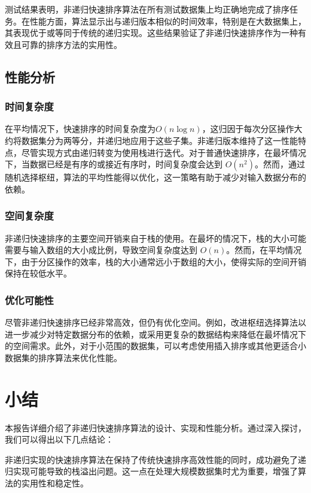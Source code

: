 \documentclass[12pt]{article}
\begin{document}
测试结果表明，非递归快速排序算法在所有测试数据集上均正确地完成了排序任务。在性能方面，算法显示出与递归版本相似的时间效率，特别是在大数据集上，其表现优于或等同于传统的递归实现。这些结果验证了非递归快速排序作为一种有效且可靠的排序方法的实用性。

\subsection{性能分析}

\subsubsection{时间复杂度}
在平均情况下，快速排序的时间复杂度为$O(n \log n)$，这归因于每次分区操作大约将数据集分为两等分，并递归地应用于这些子集。非递归版本维持了这一性能特点，尽管实现方式由递归转变为使用栈进行迭代。对于普通快速排序，在最坏情况下，当数据已经是有序的或接近有序时，时间复杂度会达到 $O(n^2)$。然而，通过随机选择枢纽，算法的平均性能得以优化，这一策略有助于减少对输入数据分布的依赖。

\subsubsection{空间复杂度}
非递归快速排序的主要空间开销来自于栈的使用。在最坏的情况下，栈的大小可能需要与输入数组的大小成比例，导致空间复杂度达到 $O(n)$。然而，在平均情况下，由于分区操作的效率，栈的大小通常远小于数组的大小，使得实际的空间开销保持在较低水平。

\subsubsection{优化可能性}
尽管非递归快速排序已经非常高效，但仍有优化空间。例如，改进枢纽选择算法以进一步减少对特定数据分布的依赖，或采用更复杂的数据结构来降低在最坏情况下的空间需求。此外，对于小范围的数据集，可以考虑使用插入排序或其他更适合小数据集的排序算法来优化性能。

\newpage

\section{小结}

本报告详细介绍了非递归快速排序算法的设计、实现和性能分析。通过深入探讨，我们可以得出以下几点结论：

非递归实现的快速排序算法在保持了传统快速排序高效性能的同时，成功避免了递归实现可能导致的栈溢出问题。这一点在处理大规模数据集时尤为重要，增强了算法的实用性和稳定性。
\end{document}
